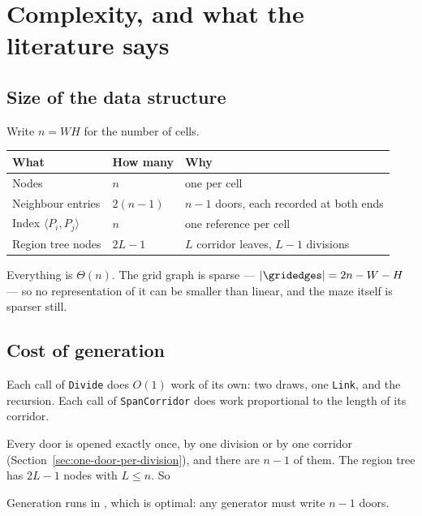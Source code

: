 \section{Complexity, and what the literature says}
\label{sec:analysis}

\subsection{Size of the data structure}

Write $n=WH$ for the number of cells.

\begin{center}
\begin{tabular}{@{}lll@{}}
  \toprule
  What & How many & Why \\
  \midrule
  Nodes                  & $n$        & one per cell \\
  Neighbour entries      & $2(n-1)$   & $n-1$ doors, each recorded at both ends \\
  Index $\langle P_i,P_j\rangle$ & $n$ & one reference per cell \\
  Region tree nodes      & $2L-1$     & $L$ corridor leaves, $L-1$ divisions \\
  \bottomrule
\end{tabular}
\end{center}

Everything is $\Theta(n)$. The grid graph is sparse --- $|\gridedges|=2n-W-H$
--- so no representation of it can be smaller than linear, and the maze itself
is sparser still.

\subsection{Cost of generation}

Each call of \texttt{Divide} does $O(1)$ work of its own: two draws, one
\texttt{Link}, and the recursion. Each call of \texttt{SpanCorridor} does work
proportional to the length of its corridor.

Every door is opened exactly once, by one division or by one corridor
(Section~\ref{sec:one-door-per-division}), and there are $n-1$ of them. The
region tree has $2L-1$ nodes with $L\le n$. So

\begin{keypoint}
Generation runs in , which is optimal: any
generator must write $n-1$ doors.
\end{keypoint}

